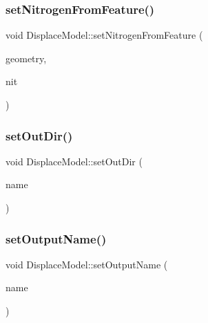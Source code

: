 \mbox{\label{class_displace_model_a3369a8c856b7648b2267c804d580a833}} 
\subsubsection{\texorpdfstring{setNitrogenFromFeature()}{setNitrogenFromFeature()}}
{\footnotesize\ttfamily void Displace\+Model\+::set\+Nitrogen\+From\+Feature (\begin{DoxyParamCaption}\item[{O\+G\+R\+Geometry $\ast$}]{geometry,  }\item[{double}]{nit }\end{DoxyParamCaption})}

\mbox{\label{class_displace_model_a8ea114f697f6470d535466555f67c17e}} 
\subsubsection{\texorpdfstring{setOutDir()}{setOutDir()}}
{\footnotesize\ttfamily void Displace\+Model\+::set\+Out\+Dir (\begin{DoxyParamCaption}\item[{const Q\+String \&}]{name }\end{DoxyParamCaption})\hspace{0.3cm}{\ttfamily [inline]}}

\mbox{\label{class_displace_model_ad86ebbb9f346a4b14545c39e8c635946}} 
\subsubsection{\texorpdfstring{setOutputName()}{setOutputName()}}
{\footnotesize\ttfamily void Displace\+Model\+::set\+Output\+Name (\begin{DoxyParamCaption}\item[{const Q\+String \&}]{name }\end{DoxyParamCaption})\hspace{0.3cm}{\ttfamily [inline]}}

